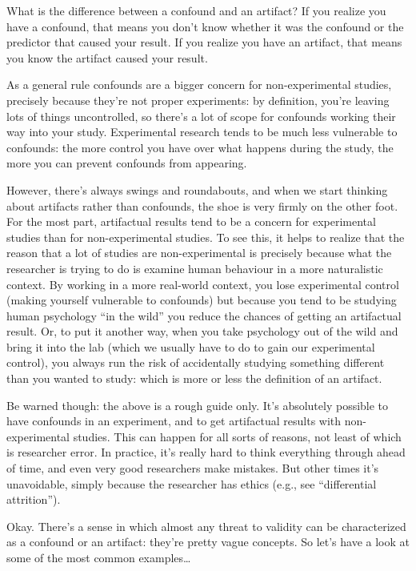 \documentclass[
]{book}
\begin{document}
What is the difference between a confound and an artifact? If you realize you have a confound, that means you don't know whether it was the confound or the predictor that caused your result. If you realize you have an artifact, that means you know the artifact caused your result.

As a general rule confounds are a bigger concern for non-experimental studies, precisely because they're not proper experiments: by definition, you're leaving lots of things uncontrolled, so there's a lot of scope for confounds working their way into your study. Experimental research tends to be much less vulnerable to confounds: the more control you have over what happens during the study, the more you can prevent confounds from appearing.

However, there's always swings and roundabouts, and when we start thinking about artifacts rather than confounds, the shoe is very firmly on the other foot. For the most part, artifactual results tend to be a concern for experimental studies than for non-experimental studies. To see this, it helps to realize that the reason that a lot of studies are non-experimental is precisely because what the researcher is trying to do is examine human behaviour in a more naturalistic context. By working in a more real-world context, you lose experimental control (making yourself vulnerable to confounds) but because you tend to be studying human psychology ``in the wild'' you reduce the chances of getting an artifactual result. Or, to put it another way, when you take psychology out of the wild and bring it into the lab (which we usually have to do to gain our experimental control), you always run the risk of accidentally studying something different than you wanted to study: which is more or less the definition of an artifact.

Be warned though: the above is a rough guide only. It's absolutely possible to have confounds in an experiment, and to get artifactual results with non-experimental studies. This can happen for all sorts of reasons, not least of which is researcher error. In practice, it's really hard to think everything through ahead of time, and even very good researchers make mistakes. But other times it's unavoidable, simply because the researcher has ethics (e.g., see ``differential attrition'').

Okay. There's a sense in which almost any threat to validity can be characterized as a confound or an artifact: they're pretty vague concepts. So let's have a look at some of the most common examples\ldots{}
\end{document}
